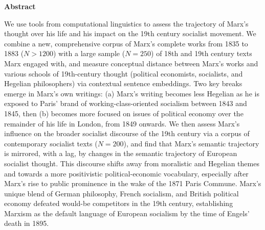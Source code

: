 
\begin{center}\small\bfseries{Abstract}\end{center}

\def\changemargin#1#2{\list{}{\rightmargin#2\leftmargin#1}\item[]}
\let\endchangemargin=\endlist

\begin{changemargin}{1cm}{1cm}
\noindent We use tools from computational linguistics to assess the trajectory of Marx's thought over his life and his impact on the 19th century socialist movement. We combine a new, comprehensive corpus of Marx's complete works from 1835 to 1883 ($N > 1200$) with a large sample ($N = 250$) of 18th and 19th century texts Marx engaged with, and measure conceptual distance between Marx's works and various schools of 19th-century thought (political economists, socialists, and Hegelian philosophers) via contextual sentence embeddings. Two key breaks emerge in Marx's own writings: (a) Marx's writing becomes less Hegelian as he is exposed to Paris' brand of working-class-oriented socialism between 1843 and 1845, then (b) becomes more focused on issues of political economy over the remainder of his life in London, from 1849 onwards. We then assess Marx's influence on the broader socialist discourse of the 19th century via a corpus of contemporary socialist texts ($N = 200$), and find that Marx's semantic trajectory is mirrored, with a lag, by changes in the semantic trajectory of European socialist thought. This discourse shifts away from moralistic and Hegelian themes and towards a more positivistic political-economic vocabulary, especially after Marx's rise to public prominence in the wake of the 1871 Paris Commune. Marx's unique blend of German philosophy, French socialism, and British political economy defeated would-be competitors in the 19th century, establishing Marxism as the default language of European socialism by the time of Engels' death in 1895.
\end{changemargin}
